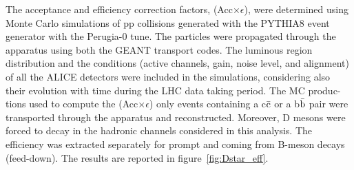 The acceptance and efficiency correction factors, (Acc$\times \epsilon$), were determined using Monte Carlo simulations of pp collisions generated with the PYTHIA8 event generator with the Perugia-0 tune. The particles were propagated through the apparatus using both the GEANT transport codes. The luminous region distribution and the conditions (active channels, gain, noise level, and alignment) of all the ALICE detectors were included in the simulations, considering also their evolution with time during the LHC data taking period. The MC produc-
tions used to compute the (Acc$\times \epsilon$) only events containing a c$\bar{\rm c}$ or a b$\bar{\rm b}$ pair were transported through the apparatus and reconstructed. Moreover, D mesons were forced to decay in the hadronic channels considered in this analysis. The efficiency was extracted separately for prompt \Dstar and \Dstar
coming from B-meson decays (feed-down). The results are reported in figure~\ref{fig:Dstar_eff}.





